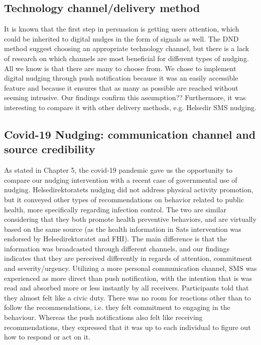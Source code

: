 \subsection{Technology channel/delivery method}
It is known that the first step in persuasion is getting users attention, which could be inherited to digital nudges in the form of signals as well. The DND method \cite{mirsch_making_2018} suggest choosing an appropriate technology channel, but there is a lack of research on which channels are most beneficial for different types of nudging.  All we know is that there are many to choose from. We chose to implement digital nudging through push notification because it was an easily accessible feature and because it ensures that as many as possible are reached without seeming intrusive. Our findings confirm this assumption?? Furthermore, it was interesting to compare it with other delivery methods, e.g. Helsedir SMS nudging. 

\subsection{Covid-19 Nudging: communication channel and source credibility}
As stated in Chapter 5, the covid-19 pandemic gave us the opportunity to compare our nudging intervention with a recent case of governmental use of nudging. Helsedirektoratets nudging did not address physical activity promotion, but it conveyed other types of recommendations on behavior related to public health, more specifically regarding infection control. The two are similar considering that they both promote health preventive behaviors, and are virtually based on the same source (as the health information in Sats intervention was endorsed by Helsedirektoratet and FHI). The main difference is that the information was broadcasted through different channels, and our findings indicates that they are perceived differently in regards of attention, commitment and severity/urgency. Utilizing a more personal communication channel, SMS was experienced as more direct than push notification, with the intention that is was read and absorbed more or less instantly by all receivers. Participants told that they almost felt like a civic duty. There was no room for reactions other than to follow the recommendations, i.e. they felt commitment to engaging in the behaviour. Whereas the push notifications also felt like receiving recommendations, they expressed that it was up to each individual to figure out how to respond or act on it. 

